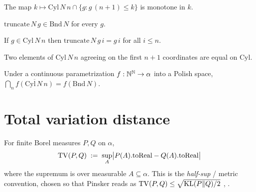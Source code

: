 \begin{lemma}
\label{lem:monotone-cyl-split}
  \leanok
The map $k \mapsto \mathrm{Cyl}\,N\,n \cap \{g : g\,(n+1) \le k\}$
is monotone in $k$.
\end{lemma}

\begin{lemma}
\label{lem:truncate-mem-bnd}
  \leanok
$\mathrm{truncate}\,N\,g \in \mathrm{Bnd}\,N$ for every $g$.
\end{lemma}

\begin{lemma}
\label{lem:truncate-agree-on-cyl}
  \leanok
If $g \in \mathrm{Cyl}\,N\,n$ then $\mathrm{truncate}\,N\,g\,i = g\,i$
for all $i \le n$.
\end{lemma}

\begin{lemma}
\label{lem:cyl-ext}
  \leanok
Two elements of $\mathrm{Cyl}\,N\,n$ agreeing on the first $n+1$
coordinates are equal on $\mathrm{Cyl}$.
\end{lemma}

\begin{lemma}
\label{lem:iInter-closure-image-cyl-eq}
  \leanok
Under a continuous parametrization $f : \mathbb{N}^{\mathbb{N}} \to \alpha$ into a
Polish space,
$\bigcap_n \overline{f(\mathrm{Cyl}\,N\,n)} = f(\mathrm{Bnd}\,N)$.
\end{lemma}

\section{Total variation distance}\label{sec:tv}

\begin{defn}
\label{def:tv-dist-real}
  \leanok
For finite Borel measures $P, Q$ on $\alpha$,
\[
  \mathrm{TV}(P, Q) \;:=\; \sup_A \bigl| P(A).\mathrm{toReal} - Q(A).\mathrm{toReal} \bigr|
\]
where the supremum is over measurable $A \subseteq \alpha$. This is
the \emph{half-sup} / metric convention, chosen so that Pinsker
reads as $\mathrm{TV}(P,Q) \le \sqrt{\mathrm{KL}(P\|Q)/2}$
\cite[\S3]{bogachev2007}, \cite[Ch.~1]{villani2009}.
\end{defn}


